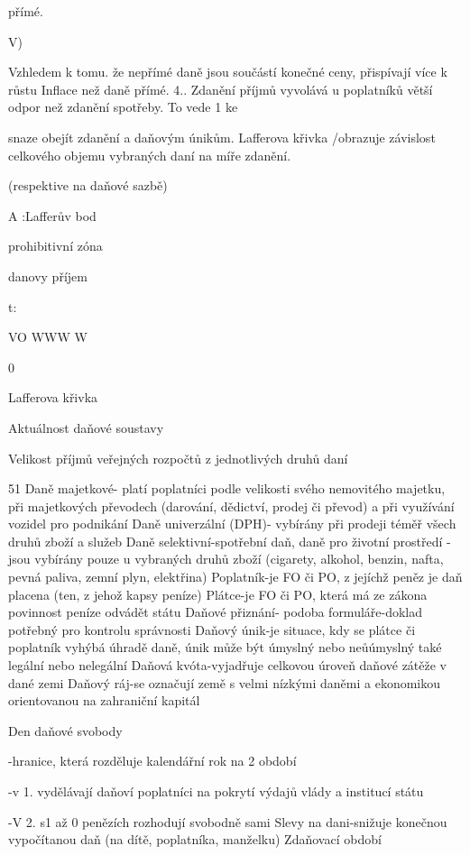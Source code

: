 přímé.

V)

Vzhledem k tomu. že nepřímé daně jsou součástí konečné ceny, přispívají více k růstu
Inflace než daně přímé.
4.. Zdanění příjmů vyvolává u poplatníků větší odpor než zdanění spotřeby. To vede 1 ke

snaze obejít zdanění a daňovým únikům.
Lafferova křivka
/obrazuje závislost celkového objemu vybraných daní na míře zdanění.

(respektive na daňové sazbě)

A :Lafferův bod





prohibitivní
zóna

danovy příjem

t:




VO WWW W

0%

Lafferova křivka

Aktuálnost daňové soustavy

Velikost příjmů veřejných rozpočtů z jednotlivých druhů daní

51
\newpage
Daně majetkové- platí poplatníci podle velikosti svého nemovitého majetku,
při majetkových převodech (darování, dědictví, prodej či převod) a při
využívání vozidel pro podnikání
Daně univerzální (DPH)- vybírány při prodeji téměř všech druhů zboží a služeb
Daně selektivní-spotřební daň, daně pro životní prostředí
-jsou vybírány pouze u vybraných druhů zboží
(cigarety, alkohol, benzin, nafta, pevná paliva, zemní plyn, elektřina)
Poplatník-je FO či PO, z jejíchž peněz je daň placena (ten, z jehož kapsy peníze)
Plátce-je FO či PO, která má ze zákona povinnost peníze odvádět státu
Daňové přiznání- podoba formuláře-doklad potřebný pro kontrolu správnosti
Daňový únik-je situace, kdy se plátce či poplatník vyhýbá úhradě daně, únik
může být úmyslný nebo neůúmyslný také legální nebo nelegální
Daňová kvóta-vyjadřuje celkovou úroveň daňové zátěže v dané zemi
Daňový ráj-se označují země s velmi nízkými daněmi a ekonomikou orientovanou
na zahraniční kapitál

Den daňové svobody

-hranice, která rozděluje kalendářní rok na 2 období

-v 1. vydělávají daňoví poplatníci na pokrytí výdajů vlády a institucí státu

-V 2. s1 až 0 penězích rozhodují svobodně sami
Slevy na dani-snižuje konečnou vypočítanou daň (na dítě, poplatníka, manželku)
Zdaňovací období

